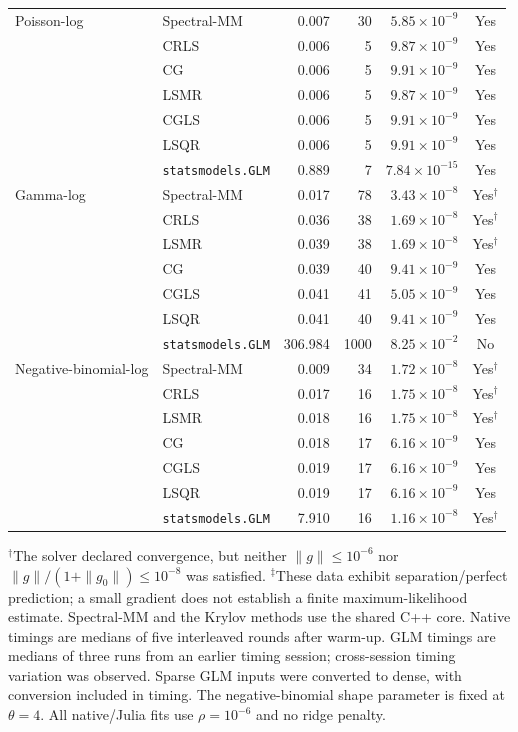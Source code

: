 \begin{table}[htbp]
\begin{tabular}{llrrrc}
Poisson-log
& Spectral-MM & 0.007 & 30 & $5.85\times10^{-9}$ & Yes \\
& CRLS & 0.006 & 5 & $9.87\times10^{-9}$ & Yes \\
& CG & 0.006 & 5 & $9.91\times10^{-9}$ & Yes \\
& LSMR & 0.006 & 5 & $9.87\times10^{-9}$ & Yes \\
& CGLS & 0.006 & 5 & $9.91\times10^{-9}$ & Yes \\
& LSQR & 0.006 & 5 & $9.91\times10^{-9}$ & Yes \\
& \texttt{statsmodels.GLM} & 0.889 & 7 & $7.84\times10^{-15}$ & Yes \\
\midrule

Gamma-log
& Spectral-MM & 0.017 & 78 & $3.43\times10^{-8}$ & Yes$^{\dagger}$ \\
& CRLS & 0.036 & 38 & $1.69\times10^{-8}$ & Yes$^{\dagger}$ \\
& LSMR & 0.039 & 38 & $1.69\times10^{-8}$ & Yes$^{\dagger}$ \\
& CG & 0.039 & 40 & $9.41\times10^{-9}$ & Yes \\
& CGLS & 0.041 & 41 & $5.05\times10^{-9}$ & Yes \\
& LSQR & 0.041 & 40 & $9.41\times10^{-9}$ & Yes \\
& \texttt{statsmodels.GLM} & 306.984 & 1000 & $8.25\times10^{-2}$ & No \\
\midrule

Negative-binomial-log
& Spectral-MM & 0.009 & 34 & $1.72\times10^{-8}$ & Yes$^{\dagger}$ \\
& CRLS & 0.017 & 16 & $1.75\times10^{-8}$ & Yes$^{\dagger}$ \\
& LSMR & 0.018 & 16 & $1.75\times10^{-8}$ & Yes$^{\dagger}$ \\
& CG & 0.018 & 17 & $6.16\times10^{-9}$ & Yes \\
& CGLS & 0.019 & 17 & $6.16\times10^{-9}$ & Yes \\
& LSQR & 0.019 & 17 & $6.16\times10^{-9}$ & Yes \\
& \texttt{statsmodels.GLM} & 7.910 & 16 & $1.16\times10^{-8}$ & Yes$^{\dagger}$ \\

\bottomrule
\end{tabular}
\par\smallskip
\begin{minipage}{\linewidth}
\footnotesize
$^{\dagger}$The solver declared convergence, but neither $\|g\|\leq 10^{-6}$ nor
$\|g\|/(1+\|g_0\|)\leq 10^{-8}$ was satisfied.
$^{\ddagger}$These data exhibit separation/perfect prediction; a small gradient does not establish a finite maximum-likelihood estimate.
Spectral-MM and the Krylov methods use the shared C++ core.
Native timings are medians of five interleaved rounds after warm-up.
GLM timings are medians of three runs from an earlier timing session;
cross-session timing variation was observed. Sparse GLM inputs were converted to dense, with conversion included in timing.
The negative-binomial shape parameter is fixed at $\theta=4$.
All native/Julia fits use $\rho=10^{-6}$ and no ridge penalty.
\end{minipage}
\end{table}

